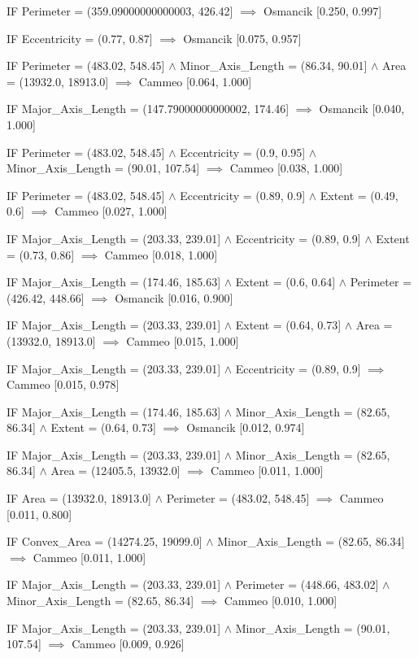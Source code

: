 IF Perimeter = (359.09000000000003, 426.42] $\implies$ Osmancik [0.250, 0.997]

IF Eccentricity = (0.77, 0.87] $\implies$ Osmancik [0.075, 0.957]

IF Perimeter = (483.02, 548.45] $\land$ Minor_Axis_Length = (86.34, 90.01] $\land$ Area = (13932.0, 18913.0] $\implies$ Cammeo [0.064, 1.000]

IF Major_Axis_Length = (147.79000000000002, 174.46] $\implies$ Osmancik [0.040, 1.000]

IF Perimeter = (483.02, 548.45] $\land$ Eccentricity = (0.9, 0.95] $\land$ Minor_Axis_Length = (90.01, 107.54] $\implies$ Cammeo [0.038, 1.000]

IF Perimeter = (483.02, 548.45] $\land$ Eccentricity = (0.89, 0.9] $\land$ Extent = (0.49, 0.6] $\implies$ Cammeo [0.027, 1.000]

IF Major_Axis_Length = (203.33, 239.01] $\land$ Eccentricity = (0.89, 0.9] $\land$ Extent = (0.73, 0.86] $\implies$ Cammeo [0.018, 1.000]

IF Major_Axis_Length = (174.46, 185.63] $\land$ Extent = (0.6, 0.64] $\land$ Perimeter = (426.42, 448.66] $\implies$ Osmancik [0.016, 0.900]

IF Major_Axis_Length = (203.33, 239.01] $\land$ Extent = (0.64, 0.73] $\land$ Area = (13932.0, 18913.0] $\implies$ Cammeo [0.015, 1.000]

IF Major_Axis_Length = (203.33, 239.01] $\land$ Eccentricity = (0.89, 0.9] $\implies$ Cammeo [0.015, 0.978]

IF Major_Axis_Length = (174.46, 185.63] $\land$ Minor_Axis_Length = (82.65, 86.34] $\land$ Extent = (0.64, 0.73] $\implies$ Osmancik [0.012, 0.974]

IF Major_Axis_Length = (203.33, 239.01] $\land$ Minor_Axis_Length = (82.65, 86.34] $\land$ Area = (12405.5, 13932.0] $\implies$ Cammeo [0.011, 1.000]

IF Area = (13932.0, 18913.0] $\land$ Perimeter = (483.02, 548.45] $\implies$ Cammeo [0.011, 0.800]

IF Convex_Area = (14274.25, 19099.0] $\land$ Minor_Axis_Length = (82.65, 86.34] $\implies$ Cammeo [0.011, 1.000]

IF Major_Axis_Length = (203.33, 239.01] $\land$ Perimeter = (448.66, 483.02] $\land$ Minor_Axis_Length = (82.65, 86.34] $\implies$ Cammeo [0.010, 1.000]

IF Major_Axis_Length = (203.33, 239.01] $\land$ Minor_Axis_Length = (90.01, 107.54] $\implies$ Cammeo [0.009, 0.926]

